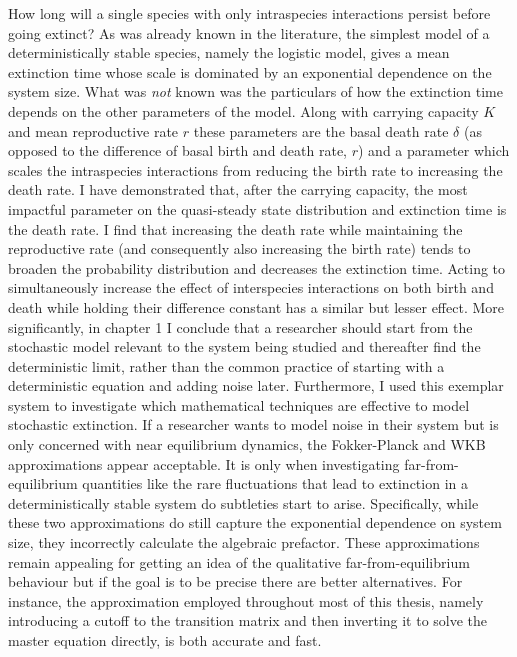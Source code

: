 How long will a single species with only intraspecies interactions persist before going extinct? 
As was already known in the literature, the simplest model of a deterministically stable species, namely the logistic model, gives a mean extinction time whose scale is dominated by an exponential dependence on the system size. 
What was \emph{not} known was the particulars of how the extinction time depends on the other parameters of the model. 
Along with carrying capacity $K$ and mean reproductive rate $r$ these parameters are the basal death rate $\delta$ (as opposed to the difference of basal birth and death rate, $r$) and a parameter which scales the intraspecies interactions from reducing the birth rate to increasing the death rate. 
I have demonstrated that, after the carrying capacity, the most impactful parameter on the quasi-steady state distribution and extinction time is the death rate. 
I find that increasing the death rate while maintaining the reproductive rate (and consequently also increasing the birth rate) tends to broaden the probability distribution and decreases the extinction time. 
Acting to simultaneously increase the effect of interspecies interactions on both birth and death while holding their difference constant has a similar but lesser effect. 
More significantly, in chapter 1 I conclude that a researcher should start from the stochastic model relevant to the system being studied and thereafter find the deterministic limit, rather than the common practice of starting with a deterministic equation and adding noise later. 
Furthermore, I used this exemplar system to investigate which mathematical techniques are effective to model stochastic extinction. 
If a researcher wants to model noise in their system but is only concerned with near equilibrium dynamics, the Fokker-Planck and WKB approximations appear acceptable. 
It is only when investigating far-from-equilibrium quantities like the rare fluctuations that lead to extinction in a deterministically stable system do subtleties start to arise. 
Specifically, while these two approximations do still capture the exponential dependence on system size, they incorrectly calculate the algebraic prefactor. 
These approximations remain appealing for getting an idea of the qualitative far-from-equilibrium behaviour but if the goal is to be precise there are better alternatives. 
For instance, the approximation employed throughout most of this thesis, namely introducing a cutoff to the transition matrix and then inverting it to solve the master equation directly, is both accurate and fast. 

